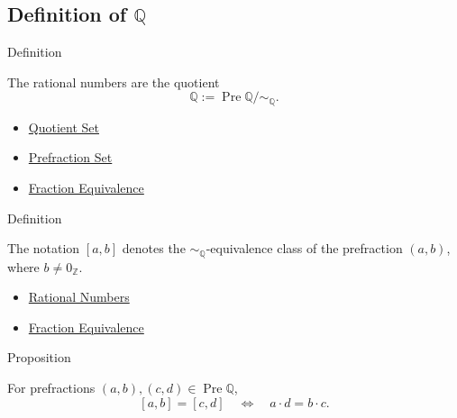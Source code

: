 \subsection*{Definition of $\mathbb{Q}$}

\begin{definitionbox}{Definition}
\begin{definition}
\label{def:rationals}
The rational numbers are the quotient
\[
\mathbb{Q}:=\operatorname{Pre}\mathbb{Q}/{\sim_{\mathbb{Q}}}.
\]
\end{definition}
\end{definitionbox}

\begin{dependencies}
\begin{itemize}
  \item \hyperref[def:quotient-set]{Quotient Set}
  \item \hyperref[def:prefraction-set]{Prefraction Set}
  \item \hyperref[def:fraction-equivalence]{Fraction Equivalence}
\end{itemize}
\end{dependencies}

\begin{definitionbox}{Definition}
\begin{definition}
\label{def:rational-class-notation}
The notation $[a,b]$ denotes the $\sim_{\mathbb{Q}}$-equivalence class of the
prefraction $(a,b)$, where $b\ne 0_{\mathbb{Z}}$.
\end{definition}
\end{definitionbox}

\begin{dependencies}
\begin{itemize}
  \item \hyperref[def:rationals]{Rational Numbers}
  \item \hyperref[def:fraction-equivalence]{Fraction Equivalence}
\end{itemize}
\end{dependencies}

\begin{propositionbox}{Proposition}
\begin{proposition}
\label{prop:equality-criterion-for-rational-classes}
For prefractions $(a,b),(c,d)\in\operatorname{Pre}\mathbb{Q}$,
\[
[a,b]=[c,d]
\quad\Longleftrightarrow\quad
a\cdot d=b\cdot c.
\]
\end{proposition}
\end{propositionbox}

